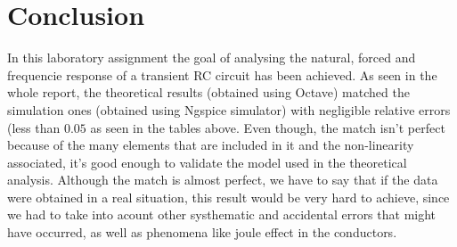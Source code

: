 \section{Conclusion}
\label{sec:conclusion}

\par In this laboratory assignment the goal of analysing the natural, forced and frequencie response of a transient RC circuit has been achieved. As seen in the whole report, the theoretical results (obtained using Octave) matched the simulation ones (obtained using Ngspice simulator) with negligible relative errors (less than $0.05$ as seen in the tables above. Even though, the match isn't perfect because of the many elements that are included in it and the non-linearity associated, it's good enough to validate the model used in the theoretical analysis. Although the match is almost perfect, we have to say that if the data were obtained in a real situation, this result would be very hard to achieve, since we had to take into acount other systhematic and accidental errors that might have occurred, as well as phenomena like joule effect in the conductors.



